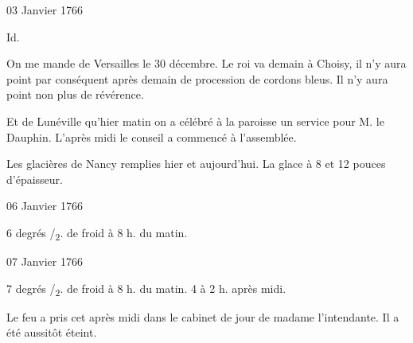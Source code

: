                      \begin{diary}{03 Janvier 1766}{}
                        
                        
                           Id. \bigskip
        
        
                         On me mande de Versailles
                           le 30 décembre.
                           Le roi va demain à
                              Choisy, il n'y aura point
                           par conséquent après demain de procession de
                           cordons bleus. Il n'y aura
                           point non plus de
                           révérence. \bigskip
        
        
                         Et de Lunéville qu'hier matin on a célébré
                           à la paroisse un service pour M. le Dauphin.
                           L'après midi le conseil a commencé
                           à l'assemblée. \bigskip
        
        
                         Les glacières de Nancy remplies hier et
                           aujourd'hui. La glace à 8 et 12 pouces d'épaisseur. \bigskip
        
        
                     \end{diary}

                     \begin{diary}{06 Janvier 1766}{}
                        
                        
                           6 degrés
                              /\textsubscript{2}. de froid à
                              8 h. du
                              matin. \bigskip
        
        
                     \end{diary}

                     \begin{diary}{07 Janvier 1766}{}
                        
                        
                           7 degrés
                              /\textsubscript{2}. de froid à
                              8 h. du
                              matin. 4 à
                           2 h. après
                              midi. \bigskip
        
        
                         Le feu a pris cet après midi dans le
                           cabinet
                           de jour de madame l'intendante. Il a été aussitôt
                           éteint. \bigskip
        
        
                     \end{diary}
                     
